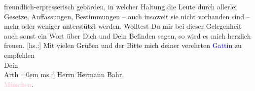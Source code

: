                freundlich-erpresserisch gebärden, in welcher Haltung die Leute durch allerlei
               Gesetze, Auffassungen, Bestimmungen – auch insoweit sie nicht vorhanden sind – mehr
               oder weniger unterstützt werden.\pend
           \pstart
           Wolltest Du mir bei dieser Gelegenheit auch sonst ein Wort über Dich und Dein
               Befinden sagen, so wird es mich herzlich freuen.\pend
           \pstart
           {[}hs.:{]} Mit vielen Grüßen und der Bitte mich deiner verehrten \textcolor{blue}{Gattin}{} zu empfehlen{\\[\baselineskip]}Dein{\\[\baselineskip]}\spacefill\mbox{Arth}\pend
           \leftskip=0em{}\pstart
           \noindent{}{[}ms.:{]}  Herrn Hermann Bahr,{\\}\textcolor{pink}{München}{}\ledrightnote{\textcolor{pink}{München}}.\pend
           \endnumbering{}  
      